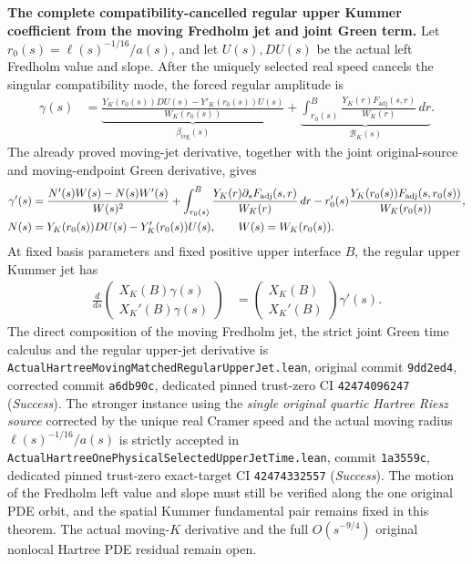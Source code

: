 \documentclass[11pt]{amsart}
\begin{document}
\medskip
\noindent\textbf{The complete compatibility-cancelled regular upper
Kummer coefficient from the moving Fredholm jet and joint Green term.}
Let \(r_0(s)=\ell(s)^{-1/16}/a(s)\), and let
\(U(s),D U(s)\) be the actual left Fredholm value and slope.
After the uniquely selected real speed cancels the singular
compatibility mode, the forced regular amplitude is
\begin{align}
 \gamma(s)
 &=
 \underbrace{
   \frac{Y_K(r_0(s))D U(s)-Y'_K(r_0(s))U(s)}
        {W_K(r_0(s))}}_{\beta_{\mathrm{reg}}(s)}
 +\underbrace{\int_{r_0(s)}^B
    \frac{Y_K(r)F_{\mathrm{adj}}(s,r)}{W_K(r)}\,dr}
  _{\mathcal B_K(s)}.
 \label{eq:true-hartree-moving-regular-gamma}
\end{align}
The already proved moving-jet derivative, together with the joint
original-source and moving-endpoint Green derivative, gives
\begin{align}
 \gamma'(s)
 &=\frac{N'(s)W(s)-N(s)W'(s)}{W(s)^2}
   +\int_{r_0(s)}^B
    \frac{Y_K(r)\partial_sF_{\mathrm{adj}}(s,r)}{W_K(r)}\,dr
   -r_0'(s)\frac{Y_K(r_0(s))F_{\mathrm{adj}}(s,r_0(s))}
       {W_K(r_0(s))},\notag\\
 N(s)&=Y_K(r_0(s))D U(s)-Y_K'(r_0(s))U(s),\qquad
 W(s)=W_K(r_0(s)).
 \label{eq:true-hartree-moving-regular-gamma-derivative}
\end{align}
At fixed basis parameters and fixed positive upper interface \(B\),
the regular upper Kummer jet has
\begin{align}
 \frac{d}{ds}
 \begin{pmatrix}
 X_K(B)\gamma(s)\\
 X_K'(B)\gamma(s)
 \end{pmatrix}
 &=
 \begin{pmatrix}
 X_K(B)\\
 X_K'(B)
 \end{pmatrix}\gamma'(s).
 \label{eq:true-hartree-moving-upper-regular-jet-derivative}
\end{align}
The direct composition of the moving Fredholm jet, the
strict joint Green time calculus and the regular upper-jet derivative
is \texttt{ActualHartreeMovingMatchedRegularUpperJet.lean},
original commit \texttt{9dd2ed4}, corrected commit \texttt{a6db90c},
dedicated pinned trust-zero CI \texttt{42474096247} (\emph{Success}).
The stronger instance using the \emph{single original quartic Hartree
Riesz source} corrected by the unique real Cramer speed and the actual
moving radius \(\ell(s)^{-1/16}/a(s)\) is strictly accepted in
\texttt{ActualHartreeOnePhysicalSelectedUpperJetTime.lean},
commit \texttt{1a3559c}, dedicated pinned trust-zero exact-target
CI \texttt{42474332557} (\emph{Success}).
The motion of the Fredholm left value and slope must still be
verified along the one original PDE orbit, and the spatial
Kummer fundamental pair remains fixed in this theorem.
The actual moving-\(K\) derivative and the full
\(O(s^{-9/4})\) original nonlocal Hartree PDE residual remain open.
\end{document}
